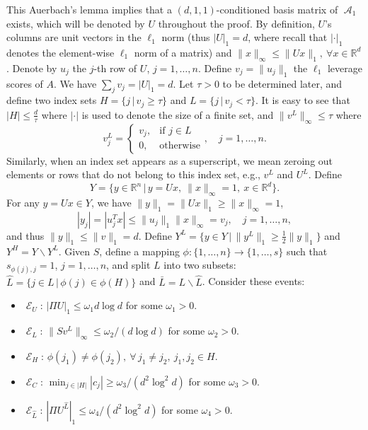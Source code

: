 \documentclass[11pt]{article}
\DeclareMathOperator{\A}{\mathcal{A}}
\DeclareMathOperator{\E}{\mathcal{E}}
\begin{document}
\noindent
This Auerbach's lemma implies that a $(d, 1, 1)$-conditioned basis matrix of
$\A_1$ exists, which will be denoted by $U$ throughout the proof.
By definition, $U$'s columns are unit vectors in the $\ell_1$ norm 
(thus $|U|_1 = d$, where recall that $|\cdot|_{1}$ denotes the element-wise 
$\ell_{1}$ norm of a matrix) 
and $\|x\|_\infty \leq \|U x\|_1,\ \forall x \in \mathbb{R}^d$.
Denote by $u_j$ the $j$-th row of $U$, $j=1,\ldots,n$.
Define $v_j = \|u_j\|_1$ the $\ell_1$ leverage scores of $A$.
We have $\sum_j v_j =|U|_1 = d$.
Let $\tau > 0$ to be determined later, and define two index sets $H = \{ j \,|\,
v_j \geq \tau \}$ and $L = \{ j \,|\, v_j < \tau \}$.
It is easy to see that $|H| \leq \frac{d}{\tau}$ where $|\cdot|$ is used to
denote the size of a finite set, and $\|v^L\|_\infty \leq \tau$ where
\begin{equation*}
  v^L_j =
  \begin{cases}
    v_j, & \text{if } j \in L \\
    0, & \text{otherwise}
  \end{cases},
  \quad
  j = 1,\ldots,n.
\end{equation*}
Similarly, when an index set appears as a superscript, we mean zeroing out
elements or rows that do not belong to this index set, e.g., $v^L$ and $U^L$.
Define
\begin{equation*}
  Y = \{ y \in \mathbb{R}^n \,|\, y = U x,\ \|x\|_\infty = 1,\ x \in \mathbb{R}^d \}.
\end{equation*}
For any $y = U x \in Y$, we have $\|y\|_1 = \|U x\|_1 \geq \|x\|_\infty = 1$,
\begin{equation*}
  |y_j| = |u_j^T x| \leq \|u_j\|_1 \|x\|_\infty = v_j, \quad j = 1,\ldots,n,
\end{equation*}
and thus $\|y\|_1 \leq \|v\|_1 = d$.
Define $Y^L = \{ y \in Y \,|\, \|y^L\|_1 \geq \frac{1}{2} \|y\|_1\}$ and $Y^H =
Y \backslash Y^L$.
Given $S$, define a mapping $\phi: \{1, \ldots, n\} \to \{1, \ldots, s\}$ such
that $s_{\phi(j), j} = 1$, $j=1,\ldots,n$, and split $L$ into two subsets:
$\hat{L} = \{ j \in L \,|\, \phi(j) \in \phi(H) \}$ and $\bar{L} =
L\backslash\hat{L}$.
Consider these events:
\begin{itemize}
\item $\E_U$: $|\Pi U|_1 \leq \omega_1 d \log d$ for some $\omega_1 > 0$.

\item $\E_L$: $\|S v^L\|_\infty \leq \omega_2/(d \log d)$ for some $\omega_2 > 0$.

\item $\E_H$: $\phi(j_1) \neq \phi(j_2),\ \forall\,j_1 \neq j_2,\ j_1, j_2 \in H$.    

\item $\E_{C}$: $\min_{j \in |H|} |c_j| \geq \omega_3/(d^2 \log^2d)$
  for some $\omega_3 > 0$.

\item $\E_{\hat{L}}$: $|\Pi U^{\hat{L}}|_1 \leq \omega_4/(d^2 \log^2d)$
  for some $\omega_4 > 0$.
\end{itemize}
\end{document}
